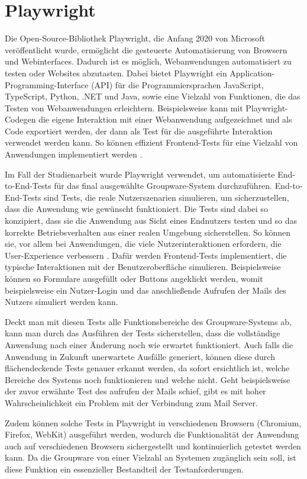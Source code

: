 \section{Playwright}

Die Open-Source-Bibliothek Playwright, die Anfang 2020 von Microsoft veröffentlicht wurde, ermöglicht die gesteuerte Automatisierung von Browsern und Webinterfaces. Dadurch ist es möglich, Webanwendungen automatisiert zu testen oder Websites abzutasten.
Dabei bietet Playwright ein Application-Programming-Interface (API) für die Programmiersprachen JavaScript, TypeScript, Python, .NET und Java, sowie eine Vielzahl von Funktionen, die das Testen von Webanwendungen erleichtern.
Beispielsweise kann mit Playwright-Codegen die eigene Interaktion mit einer Webanwendung aufgezeichnet und als Code exportiert werden, der dann als Test für die ausgeführte Interaktion verwendet werden kann.
So können effizient Frontend-Tests für eine Vielzahl von Anwendungen implementiert werden \autocite[][]{playwright}.

Im Fall der Studienarbeit wurde Playwright verwendet, um automatisierte End-to-End-Tests für das final ausgewählte Groupware-System durchzuführen.
End-to-End-Tests sind Tests, die reale Nutzerszenarien simulieren, um sicherzustellen, dass die Anwendung wie gewünscht funktioniert.
Die Tests sind dabei so konzipiert, dass sie die Anwendung aus Sicht eines Endnutzers testen und so das korrekte Betriebsverhalten aus einer realen Umgebung sicherstellen.
So können sie, vor allem bei Anwendungen, die viele Nutzerinteraktionen erfordern, die User-Experience verbessern \autocite[vgl.][]{e2e-blog}.
Dafür werden Frontend-Tests implementiert, die typische Interaktionen mit der Benutzeroberfläche simulieren.
Beispielsweise können so Formulare ausgefüllt oder Buttons angeklickt werden, womit beispielsweise ein Nutzer-Login und das anschließende Aufrufen der Mails des Nutzers simuliert werden kann.

Deckt man mit diesen Tests alle Funktionsbereiche des Groupware-Systems ab, kann man durch das Ausführen der Tests sicherstellen, dass die vollständige Anwendung nach einer Änderung noch wie erwartet funktioniert.
Auch falls die Anwendung in Zukunft unerwartete Ausfälle generiert, können diese durch flächendeckende Tests genauer erkannt werden, da sofort ersichtlich ist, welche Bereiche des Systems noch funktionieren und welche nicht.
Geht beispielsweise der zuvor erwähnte Test des aufrufen der Mails schief, gibt es mit hoher Wahrscheinlichkeit ein Problem mit der Verbindung zum Mail Server.

Zudem können solche Tests in Playwright in verschiedenen Browsern (Chromium, Firefox, WebKit) ausgeführt werden, wodurch die Funktionalität der Anwendung auch auf verschiedenen Browsern sichergestellt und kontinuierlich getestet werden kann.
Da die Groupware von einer Vielzahl an Systemen zugänglich sein soll, ist diese Funktion ein essenzieller Bestandteil der Testanforderungen.







